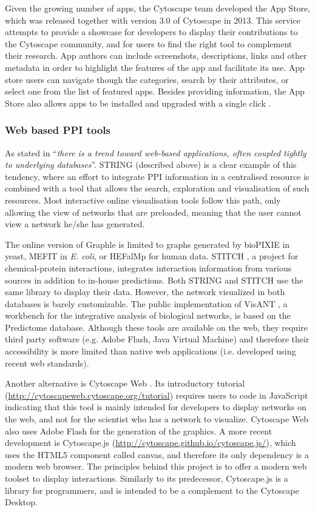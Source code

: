 Given the growing number of apps, the Cytoscape team developed the App Store, which was released together with version 3.0 of Cytoscape in 2013. This service attempts to provide a showcase for developers to display their contributions to the Cytoscape community, and for users to find the right tool to complement their research. App authors can include screenshots, descriptions, links and other metadata in order to highlight the features of the app and facilitate its use. App store users can navigate though the categories, search by their attributes, or select one from the list of featured apps. Besides providing information, the App Store also allows apps to be installed and upgraded with a single click \cite{LOT2013}. 

\subsubsection{Web based PPI tools}
As stated in \cite{GEH2010} ``\emph{there is a trend toward web-based applications, often coupled tightly to underlying databases}''. STRING (described above) is a clear example of this tendency, where an effort to integrate PPI information in a centralised resource is combined with a tool that allows the search, exploration and visualisation of such resources. Most interactive online visualisation tools follow this path, only allowing the view of networks that are preloaded, meaning that the user cannot view a network he/she has generated.

The online version of Graphle \cite{HUT2009} is limited to graphs generated by bioPIXIE in yeast, MEFIT in \emph{E. coli}, or HEFalMp for human data. STITCH \cite{KUH2008}, a project for chemical-protein interactions, integrates interaction information from various sources in addition to in-house predictions. Both STRING and STITCH use the same library to display their data. However, the network visualized in both databases is barely customizable. The public implementation of VisANT \cite{HU2013}, a workbench for the integrative analysis of biological networks, is based on the Predictome database. Although these tools are available on the web, they require third party software (e.g. Adobe Flash, Java Virtual Machine) and therefore their accessibility is more limited than native web applications (i.e. developed using recent web standards). 

Another alternative is Cytoscape Web \cite{LOP2010}. Its introductory tutorial (\url{http://cytoscapeweb.cytoscape.org/tutorial}) requires users to code in JavaScript indicating that this tool is mainly intended for developers to display networks on the web, and not for the scientist who has a network to visualize. Cytoscape Web also uses Adobe Flash for the generation of the graphics. A more recent development is Cytoscape.js (\url{http://cytoscape.github.io/cytoscape.js/}), which uses the HTML5 component called canvas, and therefore its only dependency is a modern web browser. The principles behind this project is to offer a modern web toolset to display interactions. Similarly to its predecessor, Cytoscape.js is a library for programmers, and is intended to be a complement to the Cytoscape Desktop.

